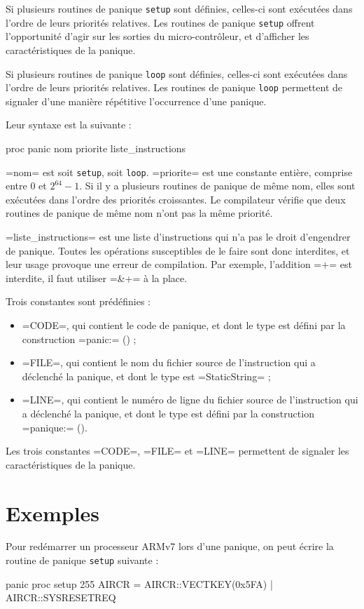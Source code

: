Si plusieurs routines de panique \texttt{setup} sont définies, celles-ci sont exécutées dans l'ordre de leurs priorités relatives. Les routines de panique \texttt{setup} offrent l'opportunité d'agir sur les sorties du micro-contrôleur, et d'afficher les caractéristiques de la panique.

Si plusieurs routines de panique \texttt{loop} sont définies, celles-ci sont exécutées dans l'ordre de leurs priorités relatives. Les routines de panique \texttt{loop} permettent de signaler d'une manière répétitive l'occurrence d'une panique.


Leur syntaxe est la suivante :
\begin{PLM}
proc panic nom priorite {
  liste_instructions
}
\end{PLM}

\plm=nom= est soit \texttt{setup}, soit \texttt{loop}. \plm=priorite= est une constante entière, comprise entre $0$ et $2^{64}-1$. Si il y a plusieurs routines de panique de même nom, elles sont exécutées dans l'ordre des priorités croissantes. Le compilateur vérifie que deux routines de panique de même nom n'ont pas la même priorité.

\plm=liste_instructions= est une liste d'instructions qui n'a pas le droit d'engendrer de panique. Toutes les opérations susceptibles de le faire sont donc interdites, et leur usage provoque une erreur de compilation. Par exemple, l'addition \plm=+= est interdite, il faut utiliser \plm=&+= à la place.

Trois constantes sont prédéfinies :
\begin{itemize}
  \item \plm=CODE=, qui contient le code de panique, et dont le type est défini par la construction \plm=panic:= () ;
  \item \plm=FILE=, qui contient le nom du fichier source de l'instruction qui a déclenché la panique, et dont le type est \plm=StaticString= ;
  \item \plm=LINE=, qui contient le numéro de ligne du fichier source de l'instruction qui a déclenché la panique, et dont le type est défini par la construction \plm=panique:= ().
\end{itemize}

Les trois constantes \plm=CODE=, \plm=FILE= et \plm=LINE= permettent de signaler les caractéristiques de la panique.


\section{Exemples}

Pour redémarrer un processeur ARMv7 lors d'une panique, on peut écrire la routine de panique \texttt{setup} suivante :
\begin{PLM}
panic proc setup 255 {
  AIRCR = AIRCR::VECTKEY(0x5FA) | AIRCR::SYSRESETREQ
}
\end{PLM}
